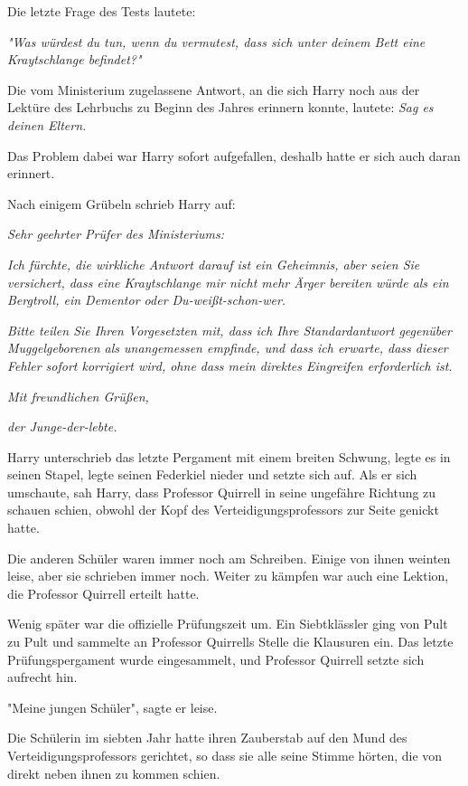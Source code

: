 {Die letzte Frage des Tests lautete:

\emph{"Was würdest du tun, wenn du vermutest, dass sich unter deinem Bett eine Kraytschlange befindet?"}

Die vom Ministerium zugelassene Antwort, an die sich Harry noch aus der Lektüre des Lehrbuchs zu Beginn des Jahres erinnern konnte, lautete: \emph{Sag es deinen Eltern.}

Das Problem dabei war Harry sofort aufgefallen, deshalb hatte er sich auch daran erinnert.

Nach einigem Grübeln schrieb Harry auf:

\emph{Sehr geehrter Prüfer des Ministeriums:}

\emph{Ich fürchte, die wirkliche Antwort darauf ist ein Geheimnis, aber seien Sie versichert, dass eine Kraytschlange mir nicht mehr Ärger bereiten würde als ein Bergtroll, ein Dementor oder Du-weißt-schon-wer.}

\emph{\hfill\break Bitte teilen Sie Ihren Vorgesetzten mit, dass ich Ihre Standardantwort gegenüber} \emph{Muggelgeborenen als unangemessen empfinde, und dass ich erwarte, dass dieser Fehler sofort korrigiert wird, ohne dass mein direktes Eingreifen erforderlich ist.}

\emph{\hfill\break Mit freundlichen Grüßen,}

\emph{der Junge-der-lebte.}

Harry unterschrieb das letzte Pergament mit einem breiten Schwung, legte es in seinen Stapel, legte seinen Federkiel nieder und setzte sich auf. Als er sich umschaute, sah Harry, dass Professor Quirrell in seine ungefähre Richtung zu schauen schien, obwohl der Kopf des Verteidigungsprofessors zur Seite genickt hatte.

Die anderen Schüler waren immer noch am Schreiben. Einige von ihnen weinten leise, aber sie schrieben immer noch. Weiter zu kämpfen war auch eine Lektion, die Professor Quirrell erteilt hatte.

Wenig später war die offizielle Prüfungszeit um. Ein Siebtklässler ging von Pult zu Pult und sammelte an Professor Quirrells Stelle die Klausuren ein. Das letzte Prüfungspergament wurde eingesammelt, und Professor Quirrell setzte sich aufrecht hin.

"Meine jungen Schüler", sagte er leise.

Die Schülerin im siebten Jahr hatte ihren Zauberstab auf den Mund des Verteidigungsprofessors gerichtet, so dass sie alle seine Stimme hörten, die von direkt neben ihnen zu kommen schien.

}
